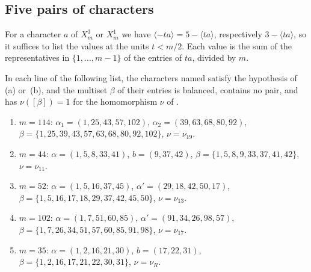 \subsection{Five pairs of characters}
For a character $a$ of $X^{3}_{m}$ or $X^{1}_{m}$ we have $\langle-ta\rangle
=5-\langle ta\rangle$, respectively $3-\langle ta\rangle$, so it suffices to
list the values at the units $t<m/2$. Each value is the sum of the
representatives in $\{1,\dots,m-1\}$ of the entries of $ta$, divided by $m$.

\begin{lemma}\label{lem:charpairs}
In each line of the following list, the characters named satisfy the
hypothesis of (a) or~(b), and the multiset $\beta$ of
their entries is balanced, contains no pair, and has $\nu([\beta])=1$ for the
homomorphism $\nu$ of .
\begin{enumerate}[label=\textup{(\roman*)}]
\item $m=114$: $\alpha_{1}=(1,25,43,57,102)$, $\alpha_{2}=(39,63,68,80,92)$,
$\beta=\{1,\allowbreak 25,\allowbreak 39,\allowbreak 43,\allowbreak 57,\allowbreak 63,\allowbreak 68,\allowbreak 80,\allowbreak 92,\allowbreak 102\}$, $\nu=\nu_{19}$.
\item $m=44$: $\alpha=(1,5,8,33,41)$, $b=(9,37,42)$,
$\beta=\{1,\allowbreak 5,\allowbreak 8,\allowbreak 9,\allowbreak 33,\allowbreak 37,\allowbreak 41,\allowbreak 42\}$, $\nu=\nu_{11}$.
\item $m=52$: $\alpha=(1,5,16,37,45)$, $\alpha'=(29,18,42,50,17)$,
$\beta=\{1,\allowbreak 5,\allowbreak 16,\allowbreak 17,\allowbreak 18,\allowbreak 29,\allowbreak 37,\allowbreak 42,\allowbreak 45,\allowbreak 50\}$, $\nu=\nu_{13}$.
\item $m=102$: $\alpha=(1,7,51,60,85)$, $\alpha'=(91,34,26,98,57)$,
$\beta=\{1,\allowbreak 7,\allowbreak 26,\allowbreak 34,\allowbreak 51,\allowbreak 57,\allowbreak 60,\allowbreak 85,\allowbreak 91,\allowbreak 98\}$, $\nu=\nu_{17}$.
\item $m=35$: $\alpha=(1,2,16,21,30)$, $b=(17,22,31)$,
$\beta=\{1,\allowbreak 2,\allowbreak 16,\allowbreak 17,\allowbreak 21,\allowbreak 22,\allowbreak 30,\allowbreak 31\}$, $\nu=\nu_{R}$.
\end{enumerate}
\end{lemma}

